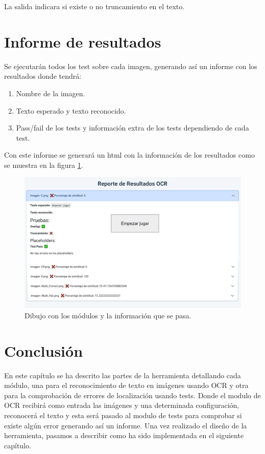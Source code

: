 La salida indicara si existe o no truncamiento en el texto.

\section{Informe de resultados}
Se ejecutarán todos los test sobre cada imagen, generando así un informe con los resultados donde tendrá:
\begin{enumerate}
	\item Nombre de la imagen.
	\item Texto esperado y texto reconocido.
	\item Pass/fail de los tests y información extra de los tests dependiendo de cada test.
\end{enumerate}
Con este informe se generará un html con la información de los resultados como se muestra en la figura \ref{fig:Descripcion_Informe}.
\begin{figure}[H]
	\centering
	\includegraphics[width = 1\textwidth]{Imagenes/Des_Informe.png}
	\caption{Dibujo con los módulos y la información que se pasa.}
	\label{fig:Descripcion_Informe}
\end{figure}
\section{Conclusión}
En este capítulo se ha descrito las partes de la herramienta detallando cada módulo, una para el reconocimiento de texto en imágenes usando OCR y otra para la comprobación de errores de localización usando tests. Donde el modulo de OCR recibirá como entrada las imágenes y una determinada configuración, reconocerá el texto y esta será pasado al modulo de tests para comprobar si existe algún error generando así un informe.
Una vez realizado el diseño de la herramienta, pasamos a describir como ha sido implementada en el siguiente capítulo.
 

